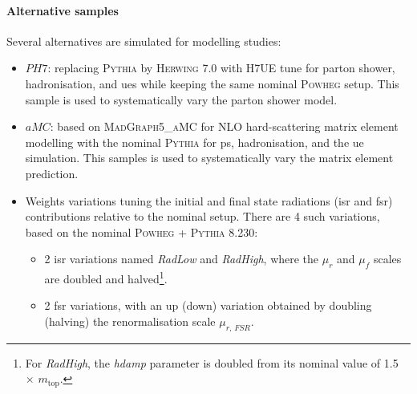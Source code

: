 \paragraph{Alternative samples} Several alternatives are simulated for modelling studies:
\begin{itemize}
  \item $PH7$: replacing \textsc{Pythia} by \textsc{Herwing} 7.0 with H7UE tune \cite{herwig7R} for parton shower, hadronisation, and \gls{ue}s while keeping the same nominal \textsc{Powheg} setup. This sample is used to systematically vary the parton shower model.
  \item $aMC$: based on \textsc{MadGraph5\_aMC\@NLO} \cite{madgraph} for NLO hard-scattering matrix element modelling with the nominal \textsc{Pythia} for \gls{ps}, hadronisation, and the \gls{ue} simulation. This samples is used to systematically vary the matrix element prediction.
  \item Weights variations tuning the initial and final state radiations (\gls{isr} and \gls{fsr}) contributions relative to the nominal setup. There are 4 such variations, based on the nominal \textsc{Powheg} + \textsc{Pythia} 8.230:
  \begin{itemize}
    \item 2 \gls{isr} variations named \textit{RadLow} and \textit{RadHigh}, where the $\mu_r$ and $\mu_f$ scales are doubled and halved\footnote{For \textit{RadHigh}, the \textit{hdamp} parameter is doubled from its nominal value of 1.5 $\times$ $m_{\text{top}}$.}.
    \item 2 \gls{fsr} variations, with an up (down) variation obtained by doubling (halving) the renormalisation scale $\mu_{r,\, FSR}$. %
  \end{itemize}
\end{itemize} 

